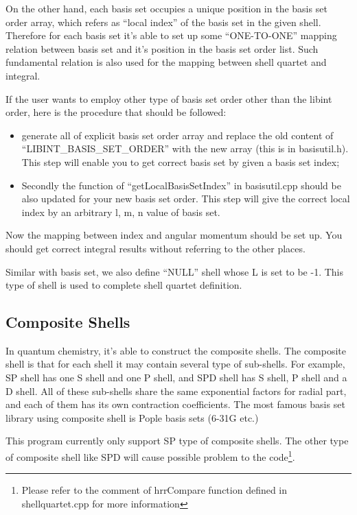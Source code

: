 On the other hand, each basis set occupies a unique position in the 
basis set order array, which refers as ``local index'' of the 
basis set in the given shell. Therefore for 
each basis set it's able to set up some ``ONE-TO-ONE'' mapping 
relation between basis set and it's position in the basis set 
order list. Such fundamental relation is also used for the 
mapping between shell quartet and integral.

If the user wants to employ other type of basis set order other 
than the libint order, here is the procedure that should be 
followed:
\begin{itemize}
 \item generate all of explicit basis set order array and 
	 replace the old content of ``LIBINT\_BASIS\_SET\_ORDER''
	 with the new array (this is in basisutil.h). This step
	 will enable you to get correct basis set by given 
	 a basis set index;
 \item Secondly the function of ``getLocalBasisSetIndex'' in
	 basisutil.cpp should be also updated for your new basis 
	 set order. This step will give the correct local index
	 by an arbitrary l, m, n value of basis set.
\end{itemize}
Now the mapping between index and angular momentum should be 
set up. You should get correct integral results without 
referring to the other places.

Similar with basis set, we also define ``NULL'' shell whose 
L is set to be -1. This type of shell is used to complete 
shell quartet definition.

\subsection{Composite Shells}
%
%
\label{composite_shell}
%
%
In quantum chemistry, it's able to construct the composite shells.
The composite shell is that for each shell it may contain several
type of sub-shells. For example, SP shell has one S shell and one 
P shell, and SPD shell has S shell, P shell and a D shell. All of 
these sub-shells share the same exponential factors for radial part,
and each of them has its own contraction coefficients. The most
famous basis set library using composite shell is Pople basis 
sets (6-31G etc.)

This program currently only support SP type of composite shells.
The other type of composite shell like SPD will cause possible
problem to the code\footnote{Please refer to the comment of 
hrrCompare function defined in shellquartet.cpp for more information}.

